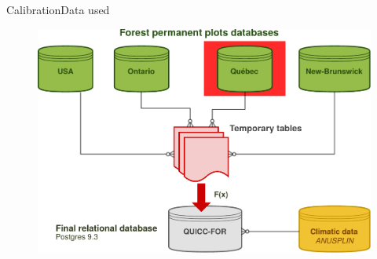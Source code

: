 \documentclass[10pt,aspectratio=149]{beamer}
\begin{document}

\begin{frame}[t]{Calibration}{Data used}
	\vspace{-1em}
\begin{figure}
	\includegraphics[width=.70\paperwidth]{Figs/QUICCFOR2.pdf}
\end{figure}

\end{frame}


\end{document}
